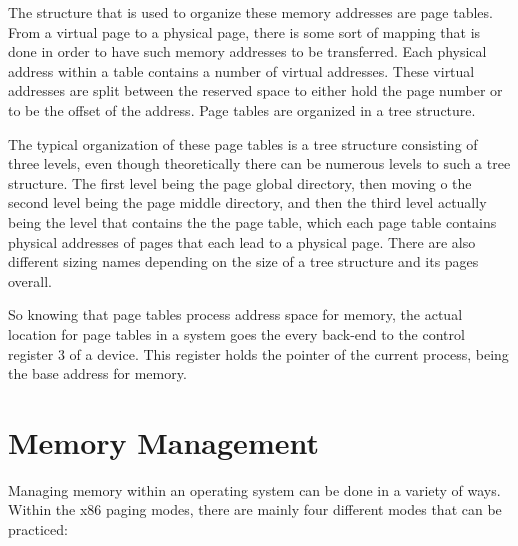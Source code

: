 \documentclass[letterpaper,10pt,onecolumn]{IEEEtran}
\begin{document}
\par
The structure that is used to organize these memory addresses are page tables. From a virtual page to a physical page, there is some sort of mapping that is done in order to have such memory addresses to be transferred. Each physical address within a table contains a number of virtual addresses. These virtual addresses are split between the reserved space to either hold the page number or to be the offset of the address. Page tables are organized in a tree structure. 
\par
The typical organization of these page tables is a tree structure consisting of three levels, even though theoretically there can be numerous levels to such a tree structure. The first level being the page global directory, then moving o the second level being the page middle directory, and then the third level actually being the level that contains the the page table, which each page table contains physical addresses of pages that each lead to a physical page. There are also different sizing names depending on the size of a tree structure and its pages overall.
\par
So knowing that page tables process address space for memory, the actual location for page tables in a system goes the every back-end to the control register 3 of a device. This register holds the pointer of the current process, being the base address for memory.

\section*{Memory Management}
\par
Managing memory within an operating system can be done in a variety of ways. Within the x86 paging modes, there are mainly four different modes that can be practiced:
\end{document}
